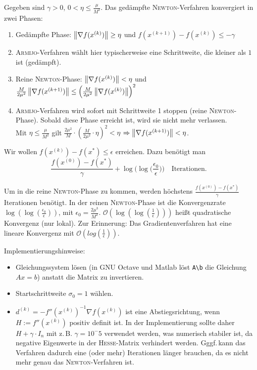 Gegeben sind $\gamma > 0$, $0 < \eta \leq \frac{\mu}{M^2}$. Das gedämpfte \textsc{Newton}-Verfahren konvergiert in zwei Phasen:
\begin{enumerate}
 \item Gedämpfte Phase: $\left\lVert\nabla f(x^{(k)})\right\rVert \geq \eta$ und $f(x^{(k + 1)}) - f(x^{(k)}) \leq -\gamma$
 \item[] \textsc{Armijo}-Verfahren wählt hier typischerweise eine Schrittweite, die kleiner als $1$ ist (\glqq ge\-dämpft\grqq).
 \item Reine \textsc{Newton}-Phase: $\left\lVert\nabla f(x^{(k)})\right\rVert < \eta$ und
 $\frac{M}{2\mu^2}\left\lVert\nabla f(x^{(k+1)})\right\rVert \leq \left(\frac{M}{2\mu^2}\left\lVert\nabla f(x^{(k)})\right\rVert\right)^2$
 \item[] \textsc{Armijo}-Verfahren wird sofort mit Schrittweite 1 stoppen (\glqq reine\grqq{} \textsc{Newton}-Phase).
 Sobald diese Phase erreicht ist, wird sie nicht mehr verlassen. \\
 Mit $\eta \leq \frac{\mu}{M^2}$ gilt
 $\frac{2\mu^2}{M} \cdot \left(\frac{M}{2\mu^2}\cdot\eta\right)^2 < \eta$ 
 $\Rightarrow \left\lVert\nabla f(x^{(k+1)})\right\rVert < \eta$.
\end{enumerate}

Wir wollen $f(x^{(k)}) - f(x^*) \leq \epsilon$ erreichen. Dazu benötigt man
\[\frac{f(x^{(0)}) - f(x^*)}{\gamma} + \log\bigg(\log\bigg(\frac{\epsilon_0}{\epsilon}\bigg)\bigg)\quad\text{Iterationen.}\]

Um in die reine \textsc{Newton}-Phase zu kommen, werden höchstens $\frac{f(x^{(0)}) - f(x^*)}{\gamma}$ Iterationen benötigt.
In der reinen \textsc{Newton}-Phase ist die Konvergenzrate $\log(\log(\frac{\epsilon_0}{\epsilon}))$, mit $\epsilon_0 = \frac{2\mu^3}{M^2}$.
$\mathcal{O}(\log(\log(\frac{1}{\epsilon})))$ heißt quadratische Konvergenz (nur lokal). Zur Erinnerung: Das Gradientenverfahren hat eine lineare Konvergenz mit $\mathcal{O}(log(\frac{1}{\epsilon}))$.

Implementierungshinweise:
\begin{itemize}
 \item Gleichungssystem lösen (in GNU Octave und Matlab löst \lstinline{A\b} die Gleichung $Ax = b$) anstatt die Matrix zu invertieren.
 \item Startschrittweite $\sigma_0 = 1$ wählen.
 \item $d^{(k)} = -f''(x^{(k)})^{-1} \nabla f(x^{(k)})$ ist eine Abstiegsrichtung, wenn $H := f''(x^{(k)})$ positiv definit ist. In der Implementierung sollte daher
 $H + \gamma \cdot I_n$ mit z.\,B. $\gamma = 10^-5$ verwendet werden, was numerisch stabiler ist, da negative Eigenwerte in der \textsc{Hesse}-Matrix verhindert werden. Gggf.\,kann das Verfahren dadurch eine (oder mehr) Iterationen länger brauchen, da es nicht mehr genau das \textsc{Newton}-Verfahren ist.
\end{itemize}

